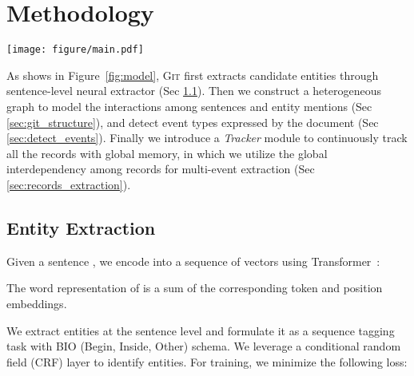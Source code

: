 \documentclass[11pt,a4paper]{article}
\newcommand{\modelname}{\textsc{Git}\xspace}
\begin{document}
 \section{Methodology}

\begin{figure*}
    \centering
    \texttt{[image: figure/main.pdf]}
    \caption{Overview of our \modelname. Firstly, sentences of the document are fed into the encoder to obtain contextualized representation, followed by a CRF layer to extract entities. Then \modelname constructs a heterogeneous graph interaction network with mention nodes and sentence nodes, which captures the global interactions among them based on GCNs.
    After obtaining document-aware representations of entities and sentences, \modelname detects event types and extracts records through the decoding module with a \textit{Tracker}. 
    The \textit{Tracker} tracks extracted records with global memory, based on which the decoding module incorporates global interdependency among correlated event records. Different entities are marked by different colors. M: Mingting Wu. X: Xiaoting Wu. N: Nov 6, 2014. S: 7.2 million.}
    \label{fig:model}
\end{figure*}

As shows in Figure~\ref{fig:model}, \modelname first extracts candidate entities through sentence-level neural extractor (Sec \ref{sec:entity_extraction}). 
Then we construct a heterogeneous graph to model the interactions among sentences and entity mentions  (Sec  \ref{sec:git_structure}), and detect event types expressed by the document (Sec \ref{sec:detect_events}).
Finally we introduce a \textit{Tracker} module to continuously track all the records with global memory, in which we utilize the global interdependency among records for multi-event extraction (Sec \ref{sec:records_extraction}).

\subsection{Entity Extraction}
\label{sec:entity_extraction}

Given a sentence , we encode  into a sequence of vectors
 using Transformer~\citep{NIPS2017_7181}:

The word representation of  is a sum of the corresponding token and position embeddings. 


We extract entities at the sentence level and formulate it as a sequence tagging task with BIO (Begin, Inside, Other) schema.
We leverage a conditional random field (CRF) layer to identify entities.
For training, we minimize the following loss:
\end{document}
